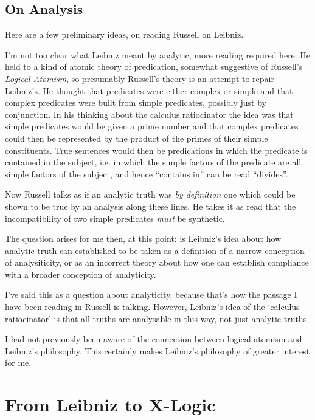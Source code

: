 \documentclass{rbjk}
\begin{document}
\begin{article}
\subsection{On Analysis}

Here are a few preliminary ideas, on reading Russell on Leibniz.

I'm not too clear what Leibniz meant by analytic, more reading required here.
He held to a kind of atomic theory of predication, somewhat suggestive of Russell's {\it Logical Atomism}, so presumably Russell's theory is an attempt to repair Leibniz's.
He thought that predicates were either complex or simple and that complex predicates were built from simple predicates, possibly just by conjunction.
In his thinking about the calculus ratiocinator the idea was that simple predicates would be given a prime number and that complex predicates could then be represented by the product of the primes of their simple constituents.
True sentences would then be predications in which the predicate is contained in the subject, i.e. in which the simple factors of the predicate are all simple factors of the subject, and hence ``contains in'' can be read ``divides''.

Now Russell talks as if an analytic truth was {\it by definition} one which could be shown to be true by an analysis along these lines.
He takes it as read that the incompatibility of two simple predicates {\it must} be synthetic.

The question arises for me then, at this point:
is Leibniz's idea about how analytic truth can established to be taken as a definition of a narrow conception of analysiticity, or as an incorrect theory about how one can establish compliance with a broader conception of analyticity.

I've said this as a question about analyticity, because that's how the passage I have been reading in Russell is talking.
However, Leibniz's idea of the `calculus ratiocinator' is that all truths are analysable in this way, not just analytic truths.

I had not previously been aware of the connection between logical atomism and Leibniz's philosophy.
This certainly makes Leibniz's philosophy of greater interest for me.

\section{From Leibniz to X-Logic}


\end{article}
\end{document}
